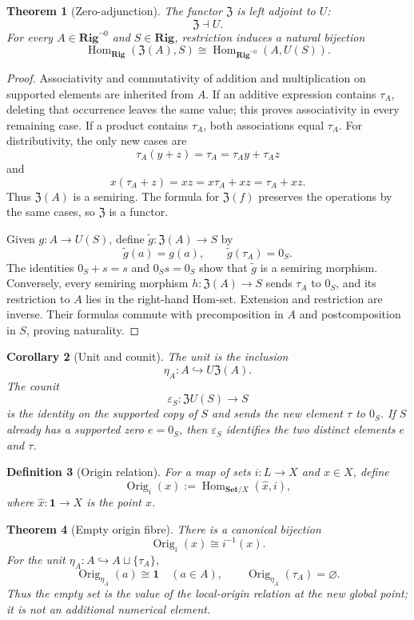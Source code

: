 \documentclass[11pt]{article}
\newtheorem{definition}{Definition}
\newtheorem{theorem}[definition]{Theorem}
\newtheorem{corollary}[definition]{Corollary}
\newcommand{\Hom}{\operatorname{Hom}}
\begin{document}
\begin{theorem}[Zero-adjunction]
The functor $\mathfrak Z$ is left adjoint to $U$:
\[
\mathfrak Z\dashv U.
\]
For every $A\in\mathbf{Rig}^{\neg0}$ and $S\in\mathbf{Rig}$, restriction induces a natural bijection
\[
\Hom_{\mathbf{Rig}}(\mathfrak Z(A),S)
\cong
\Hom_{\mathbf{Rig}^{\neg0}}(A,U(S)).
\]
\end{theorem}

\begin{proof}
Associativity and commutativity of addition and multiplication on supported elements are inherited from $A$.  If an additive expression contains $\tau_A$, deleting that occurrence leaves the same value; this proves associativity in every remaining case.  If a product contains $\tau_A$, both associations equal $\tau_A$.  For distributivity, the only new cases are
\[
\tau_A(y+z)=\tau_A=\tau_Ay+\tau_Az
\]
and
\[
x(\tau_A+z)=xz=x\tau_A+xz=\tau_A+xz.
\]
Thus $\mathfrak Z(A)$ is a semiring.  The formula for $\mathfrak Z(f)$ preserves the operations by the same cases, so $\mathfrak Z$ is a functor.

Given $g:A\to U(S)$, define $\widetilde g:\mathfrak Z(A)\to S$ by
\[
\widetilde g(a)=g(a),\qquad \widetilde g(\tau_A)=0_S.
\]
The identities $0_S+s=s$ and $0_Ss=0_S$ show that $\widetilde g$ is a semiring morphism.  Conversely, every semiring morphism $h:\mathfrak Z(A)\to S$ sends $\tau_A$ to $0_S$, and its restriction to $A$ lies in the right-hand Hom-set.  Extension and restriction are inverse.  Their formulas commute with precomposition in $A$ and postcomposition in $S$, proving naturality.
\end{proof}

\begin{corollary}[Unit and counit]
The unit is the inclusion
\[
\eta_A:A\hookrightarrow U\mathfrak Z(A).
\]
The counit
\[
\varepsilon_S:\mathfrak ZU(S)\to S
\]
is the identity on the supported copy of $S$ and sends the new element $\tau$ to $0_S$.  If $S$ already has a supported zero $e=0_S$, then $\varepsilon_S$ identifies the two distinct elements $e$ and $\tau$.
\end{corollary}

\begin{definition}[Origin relation]
For a map of sets $i:L\to X$ and $x\in X$, define
\[
\operatorname{Orig}_i(x):=
\Hom_{\mathbf{Set}/X}(\widehat x,i),
\]
where $\widehat x:\mathbf1\to X$ is the point $x$.
\end{definition}

\begin{theorem}[Empty origin fibre]
There is a canonical bijection
\[
\operatorname{Orig}_i(x)\cong i^{-1}(x).
\]
For the unit $\eta_A:A\hookrightarrow A\sqcup\{\tau_A\}$,
\[
\operatorname{Orig}_{\eta_A}(a)\cong\mathbf1\quad(a\in A),
\qquad
\operatorname{Orig}_{\eta_A}(\tau_A)=\varnothing.
\]
Thus the empty set is the value of the local-origin relation at the new global point; it is not an additional numerical element.
\end{theorem}
\end{document}
